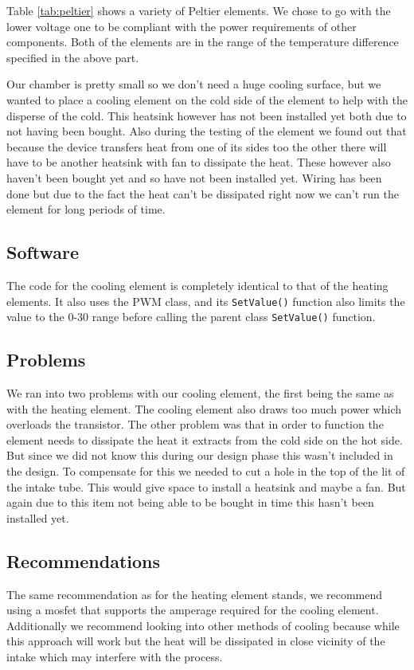 \documentclass[a4paper,oneside]{book}
\begin{document}
Table \ref{tab:peltier} shows a variety of Peltier elements. We chose to go
with the lower voltage one to be compliant with the power requirements of other
components. Both of the elements are in the range of the temperature difference
specified in the above part.

Our chamber is pretty small so we don't need a huge cooling surface, but we
wanted to place a cooling element on the cold side of the element to help with
the disperse of the cold. This heatsink however has not been installed yet both
due to not having been bought. Also during the testing of the element we found
out that because the device transfers heat from one of its sides too the other
there will have to be another heatsink with fan to dissipate the heat. These
however also haven't been bought yet and so have not been installed yet. Wiring
has been done but due to the fact the heat can't be dissipated right now we
can't run the element for long periods of time.

\subsection{Software}
The code for the cooling element is completely identical to that of the heating
elements. It also uses the PWM class, and its \lstinline|SetValue()| function
also limits the value to the 0-30 range before calling the parent class
\lstinline|SetValue()| function.

\subsection{Problems}
We ran into two problems with our cooling element, the first being the same as
with the heating element. The cooling element also draws too much power which
overloads the transistor. The other problem was that in order to function the
element needs to dissipate the heat it extracts from the cold side on the hot
side. But since we did not know this during our design phase this wasn't
included in the design. To compensate for this we needed to cut a hole in the
top of the lit of the intake tube. This would give space to install a heatsink
and maybe a fan. But again due to this item not being able to be bought in time
this hasn't been installed yet.

\subsection{Recommendations}
The same recommendation as for the heating element stands, we recommend using a
mosfet that supports the amperage required for the cooling element.
Additionally we recommend looking into other methods of cooling because while
this approach will work but the heat will be dissipated in close vicinity of
the intake which may interfere with the process.
\end{document}
